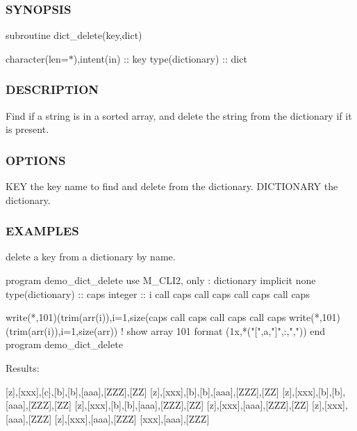 \subsubsection*{S\+Y\+N\+O\+P\+S\+IS}

subroutine dict\+\_\+delete(key,dict)

character(len=$\ast$),intent(in) \+:\+: key type(dictionary) \+:\+: dict

\subsubsection*{D\+E\+S\+C\+R\+I\+P\+T\+I\+ON}

\begin{DoxyVerb}Find if a string is in a sorted array, and delete the string
from the dictionary if it is present.
\end{DoxyVerb}


\subsubsection*{O\+P\+T\+I\+O\+NS}

\begin{DoxyVerb}KEY           the key name to find and delete from the dictionary.
DICTIONARY    the dictionary.
\end{DoxyVerb}


\subsubsection*{E\+X\+A\+M\+P\+L\+ES}

delete a key from a dictionary by name. \begin{DoxyVerb}program demo_dict_delete
use M_CLI2, only : dictionary
implicit none
type(dictionary) :: caps
integer                       :: i
call caps%
call caps%
call caps%
call caps%

write(*,101)(trim(arr(i)),i=1,size(caps%
call  caps%
call  caps%
call  caps%
write(*,101)(trim(arr(i)),i=1,size(arr)) ! show array
101 format (1x,*("[",a,"]",:,","))
end program demo_dict_delete
\end{DoxyVerb}


Results\+:

\mbox{[}z\mbox{]},\mbox{[}xxx\mbox{]},\mbox{[}c\mbox{]},\mbox{[}b\mbox{]},\mbox{[}b\mbox{]},\mbox{[}aaa\mbox{]},\mbox{[}Z\+ZZ\mbox{]},\mbox{[}ZZ\mbox{]} \mbox{[}z\mbox{]},\mbox{[}xxx\mbox{]},\mbox{[}b\mbox{]},\mbox{[}b\mbox{]},\mbox{[}aaa\mbox{]},\mbox{[}Z\+ZZ\mbox{]},\mbox{[}ZZ\mbox{]} \mbox{[}z\mbox{]},\mbox{[}xxx\mbox{]},\mbox{[}b\mbox{]},\mbox{[}b\mbox{]},\mbox{[}aaa\mbox{]},\mbox{[}Z\+ZZ\mbox{]},\mbox{[}ZZ\mbox{]} \mbox{[}z\mbox{]},\mbox{[}xxx\mbox{]},\mbox{[}b\mbox{]},\mbox{[}b\mbox{]},\mbox{[}aaa\mbox{]},\mbox{[}Z\+ZZ\mbox{]},\mbox{[}ZZ\mbox{]} \mbox{[}z\mbox{]},\mbox{[}xxx\mbox{]},\mbox{[}aaa\mbox{]},\mbox{[}Z\+ZZ\mbox{]},\mbox{[}ZZ\mbox{]} \mbox{[}z\mbox{]},\mbox{[}xxx\mbox{]},\mbox{[}aaa\mbox{]},\mbox{[}Z\+ZZ\mbox{]} \mbox{[}z\mbox{]},\mbox{[}xxx\mbox{]},\mbox{[}aaa\mbox{]},\mbox{[}Z\+ZZ\mbox{]} \mbox{[}xxx\mbox{]},\mbox{[}aaa\mbox{]},\mbox{[}Z\+ZZ\mbox{]}

